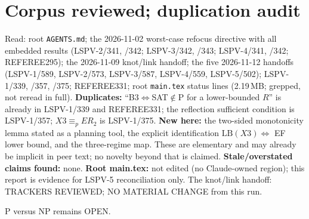 \documentclass[11pt]{article}
\theoremstyle{definition}
\begin{document}
\section{Corpus reviewed; duplication audit}
Read: root \texttt{AGENTS.md}; the 2026-11-02 worst-case refocus directive with all embedded results
(LSPV-2/341, /342; LSPV-3/342, /343; LSPV-4/341, /342; REFEREE295); the 2026-11-09 knot/link handoff; the five
2026-11-12 handoffs (LSPV-1/589, LSPV-2/573, LSPV-3/587, LSPV-4/559, LSPV-5/502); LSPV-1/339, /357, /375;
REFEREE331; root \texttt{main.tex} status lines (2.19\,MB; grepped, not reread in full).
\textbf{Duplicates:} ``B3$\iff$SAT$\notin$P for a lower-bounded $R$'' is already in LSPV-1/339 and REFEREE331;
the reflection sufficient condition is LSPV-1/357; $X3\equiv_p ER_2$ is LSPV-1/375. \textbf{New here:} the
two-sided monotonicity lemma stated as a planning tool, the explicit identification $\mathrm{LB}(X3)\iff$ EF
lower bound, and the three-regime map. These are elementary and may already be implicit in peer text; no
novelty beyond that is claimed. \textbf{Stale/overstated claims found:} none. \textbf{Root main.tex:} not edited
(no Claude-owned region); this report is evidence for LSPV-5 reconciliation only. The knot/link handoff:
TRACKERS REVIEWED; NO MATERIAL CHANGE from this run.

\noindent P versus NP remains OPEN.
\end{document}
